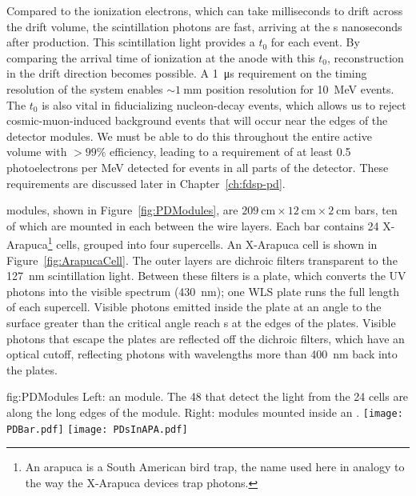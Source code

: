 Compared to the ionization electrons, which can take milliseconds to drift across the drift volume, the scintillation photons are fast, arriving at the s nanoseconds after production. This scintillation light provides a $t_{0}$ for each event. By comparing the arrival time of ionization at the anode with this $t_{0}$, reconstruction in the drift direction becomes possible. A \SI{1}{\micro\second} requirement on the timing resolution of the  system enables $\sim\!\SI{1}{\mm}$ position resolution for \SI{10}{\mega\electronvolt}  events. The  $t_{0}$ is also vital in fiducializing nucleon-decay events, which allows us to reject cosmic-muon-induced background events that will occur near the edges of the detector modules. We must be able to do this throughout the entire active volume with $>\!99\%$ efficiency, leading to a requirement of at least 0.5 photoelectrons per MeV detected for events in all parts of the detector. These requirements are discussed later in Chapter~\ref{ch:fdsp-pd}.

 modules, shown in Figure~\ref{fig:PDModules}, are %
$\SI{209}{\cm}\times\SI{12}{\cm}\times\SI{2}{\cm}$ bars, ten of which are mounted in each  between the wire layers. Each bar contains 24 X-Arapuca\footnote{An arapuca is a South American bird trap, the name used here in analogy to the way the X-Arapuca devices trap photons.} cells, grouped into four supercells. An X-Arapuca cell is shown in Figure~\ref{fig:ArapucaCell}. The outer layers are dichroic filters transparent to the \SI{127}{\nano\meter} scintillation light. Between these filters is a  plate, which converts the UV photons into the visible spectrum (\SI{430}{\nano\meter}); one WLS plate runs the full length of each supercell.
Visible photons emitted inside the  plate at an angle to the surface greater than the critical angle reach s at the edges of the plates. Visible photons that escape the  plates are reflected off the dichroic filters, which have an optical cutoff, reflecting photons with wavelengths more than \SI{400}{\nano\meter} back into the  plates.


\begin{dunefigure}{fig:PDModules}
{Left: an   module. The 48  that detect the light from the 24 cells are along the long edges of the module. Right:   modules mounted inside an .}
\texttt{[image: PDBar.pdf]}
\texttt{[image: PDsInAPA.pdf]}
\end{dunefigure}

